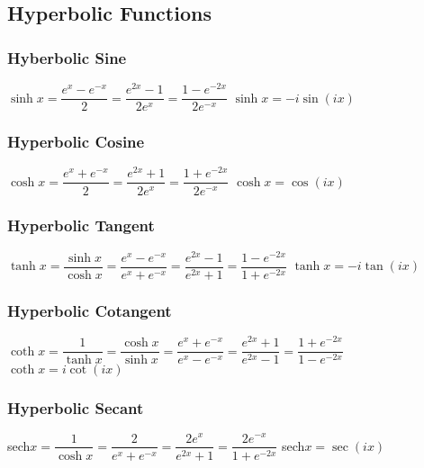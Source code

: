 \subsection{Hyperbolic Functions}

\subsubsection{Hyberbolic Sine}
\begin{itemize}
\itemt \( \sinh x = \dfrac{e^x - e^{-x}}{2} = \dfrac{e^{2x}-1}{2e^x} = \dfrac{1-e^{-2x}}{2e^{-x}} \)
\itemt \( \sinh x = -i\sin(ix) \)
\end{itemize}			

\subsubsection{Hyperbolic Cosine}			
\begin{itemize}
\itemt \( \cosh x = \dfrac{e^x + e^{-x}}{2} = \dfrac{e^{2x}+1}{2e^x} = \dfrac{1+e^{-2x}}{2e^{-x}} \)
\itemt \( \cosh x = \cos(ix) \)
\end{itemize}

\subsubsection{Hyperbolic Tangent}			
\begin{itemize}
\itemt \( \tanh x = \dfrac{\sinh x}{\cosh x} = \dfrac{e^x - e^{-x}}{e^x + e^{-x}} =  \dfrac{e^{2x}-1}{e^{2x}+1} = \dfrac{1-e^{-2x}}{1+e^{-2x}} \)
\itemt \( \tanh x = -i\tan(ix) \)
\end{itemize}

\subsubsection{Hyperbolic Cotangent}			
\begin{itemize}
\itemt \( \coth x = \dfrac{1}{\tanh x} = \dfrac{\cosh x}{\sinh x} = \dfrac{e^x + e^{-x}}{e^x - e^{-x}} =  \dfrac{e^{2x}+1}{e^{2x}-1} = \dfrac{1+e^{-2x}}{1-e^{-2x}} \)
\itemt \( \coth x = i\cot(ix) \)
\end{itemize}

\subsubsection{Hyperbolic Secant}			
\begin{itemize}
\itemt sech\(x = \dfrac{1}{\cosh x} = \dfrac{2}{e^x + e^{-x}} = \dfrac{2e^x}{e^{2x}+1} = \dfrac{2e^{-x}}{1+e^{-2x}} \)
\itemt sech\(x = \sec(ix) \)
\end{itemize}

